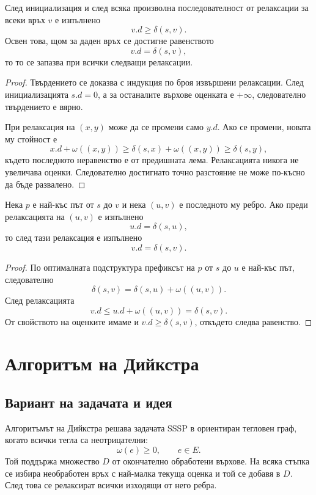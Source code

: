\begin{lem}
След инициализация и след всяка произволна последователност от релаксации за всеки връх $v$ е изпълнено
\[
v.d\geq \delta(s,v).
\]
Освен това, щом за даден връх се достигне равенството
\[
v.d=\delta(s,v),
\]
то то се запазва при всички следващи релаксации.
\end{lem}

\begin{proof}
Твърдението се доказва с индукция по броя извършени релаксации. След инициализацията $s.d=0$, а за останалите върхове оценката е $+\infty$, следователно твърдението е вярно.

При релаксация на $(x,y)$ може да се промени само $y.d$. Ако се промени, новата му стойност е
\[
x.d+\omega((x,y))
 \geq \delta(s,x)+\omega((x,y))
 \geq \delta(s,y),
\]
където последното неравенство е от предишната лема. Релаксацията никога не увеличава оценки. Следователно достигнато точно разстояние не може по-късно да бъде развалено.
\end{proof}

\begin{lem}
Нека $p$ е най-къс път от $s$ до $v$ и нека $(u,v)$ е последното му ребро. Ако преди релаксацията на $(u,v)$ е изпълнено
\[
u.d=\delta(s,u),
\]
то след тази релаксация е изпълнено
\[
v.d=\delta(s,v).
\]
\end{lem}

\begin{proof}
По оптималната подструктура префиксът на $p$ от $s$ до $u$ е най-къс път, следователно
\[
\delta(s,v)=\delta(s,u)+\omega((u,v)).
\]
След релаксацията
\[
v.d\leq u.d+\omega((u,v))=\delta(s,v).
\]
От свойството на оценките имаме и $v.d\geq\delta(s,v)$, откъдето следва равенство.
\end{proof}

\section{Алгоритъм на Дийкстра}\label{s:8.3}

\subsection{Вариант на задачата и идея}\label{s:8.3.1}

Алгоритъмът на Дийкстра решава задачата SSSP в ориентиран тегловен граф, когато всички тегла са неотрицателни:
\[
\omega(e)\geq 0,\qquad e\in E.
\]
Той поддържа множество $D$ от окончателно обработени върхове. На всяка стъпка се избира необработен връх с най-малка текуща оценка и той се добавя в $D$. След това се релаксират всички изходящи от него ребра.

